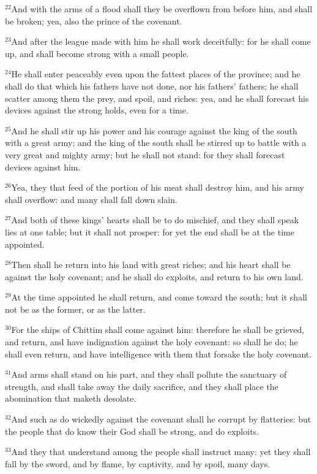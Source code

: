 \documentclass[12pt]{article}
\begin{document}
$^{22}$And with the arms of a flood shall they be overflown from before
him, and shall be broken; yea, also the prince of the covenant.


$^{23}$And after the league made with him he shall work deceitfully:
for he shall come up, and shall become strong with a small people.


$^{24}$He shall enter peaceably even upon the fattest places of the
province; and he shall do that which his fathers have not done, nor
his fathers' fathers; he shall scatter among them the prey, and spoil,
and riches: yea, and he shall forecast his devices against the strong
holds, even for a time.


$^{25}$And he shall stir up his power and his courage against the king
of the south with a great army; and the king of the south shall be
stirred up to battle with a very great and mighty army; but he shall
not stand: for they shall forecast devices against him.


$^{26}$Yea, they that feed of the portion of his meat shall destroy
him, and his army shall overflow: and many shall fall down slain.


$^{27}$And both of these kings' hearts shall be to do mischief, and
they shall speak lies at one table; but it shall not prosper: for yet
the end shall be at the time appointed.


$^{28}$Then shall he return into his land with great riches; and his
heart shall be against the holy covenant; and he shall do exploits,
and return to his own land.


$^{29}$At the time appointed he shall return, and come toward the
south; but it shall not be as the former, or as the latter.


$^{30}$For the ships of Chittim shall come against him: therefore he
shall be grieved, and return, and have indignation against the holy
covenant: so shall he do; he shall even return, and have intelligence
with them that forsake the holy covenant.


$^{31}$And arms shall stand on his part, and they shall pollute the
sanctuary of strength, and shall take away the daily sacrifice, and
they shall place the abomination that maketh desolate.


$^{32}$And such as do wickedly against the covenant shall he corrupt by
flatteries: but the people that do know their God shall be strong, and
do exploits.


$^{33}$And they that understand among the people shall instruct many:
yet they shall fall by the sword, and by flame, by captivity, and by
spoil, many days.
\end{document}
